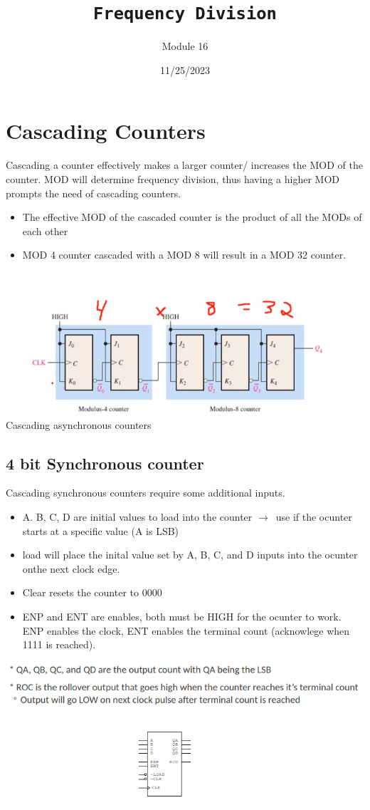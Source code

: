 \documentclass[a4paper,12pt]{article}
\title{\texttt{Frequency Division}\\\hrulefill}
\author{Module 16}
\date{\small{11/25/2023}}
\newcommand{\ra}{$\rightarrow$}
\begin{document}
    \maketitle

    \section{Cascading Counters}
        Cascading a counter effectively makes a larger counter/ increases the MOD of the counter. MOD will determine frequency division, thus having a higher MOD prompts the need of cascading counters.
        \begin{itemize}
            \item The effective MOD of the cascaded counter is the product of all the MODs of each other
            \item MOD 4 counter cascaded with a MOD 8 will result in a MOD 32 counter.
        \end{itemize}
        \includegraphics[width=12cm]{CASMOD1.png}\\Cascading asynchronous counters
           \subsection{4 bit Synchronous counter}
            Cascading synchronous counters require some additional inputs.
            \begin{itemize}
                \item A. B, C, D are initial values to load into the counter \ra~use if the ocunter starts at a specific value (A is LSB)
                \item load will place the inital value set by A, B, C, and D inputs into the ocunter onthe next clock edge.
                \item Clear resets the counter to 0000
                \item ENP and ENT are enables, both must be HIGH for the ocunter to work. ENP enables the clock, ENT enables the terminal count (acknowlege when 1111 is reached).
            \end{itemize}
            \includegraphics[width=15cm]{4bitsyncCount.png}
\end{document}
